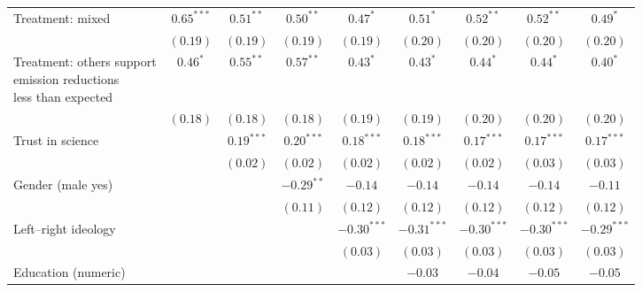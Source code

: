 \begin{table}[h]
\begin{center}
\begin{tabular}{l c c c c c c c c}
Treatment: mixed                                                                & $0.65^{***}$ & $0.51^{**}$   & $0.50^{**}$   & $0.47^{*}$    & $0.51^{*}$    & $0.52^{**}$   & $0.52^{**}$   & $0.49^{*}$    \\
                                                                                & $(0.19)$     & $(0.19)$      & $(0.19)$      & $(0.19)$      & $(0.20)$      & $(0.20)$      & $(0.20)$      & $(0.20)$      \\
\shortstack{Treatment: others support\\emission reductions\\less than expected} & $0.46^{*}$   & $0.55^{**}$   & $0.57^{**}$   & $0.43^{*}$    & $0.43^{*}$    & $0.44^{*}$    & $0.44^{*}$    & $0.40^{*}$    \\
                                                                                & $(0.18)$     & $(0.18)$      & $(0.18)$      & $(0.19)$      & $(0.19)$      & $(0.20)$      & $(0.20)$      & $(0.20)$      \\
Trust in science                                                                &              & $0.19^{***}$  & $0.20^{***}$  & $0.18^{***}$  & $0.18^{***}$  & $0.17^{***}$  & $0.17^{***}$  & $0.17^{***}$  \\
                                                                                &              & $(0.02)$      & $(0.02)$      & $(0.02)$      & $(0.02)$      & $(0.02)$      & $(0.03)$      & $(0.03)$      \\
Gender (male yes)                                                               &              &               & $-0.29^{**}$  & $-0.14$       & $-0.14$       & $-0.14$       & $-0.14$       & $-0.11$       \\
                                                                                &              &               & $(0.11)$      & $(0.12)$      & $(0.12)$      & $(0.12)$      & $(0.12)$      & $(0.12)$      \\
Left–right ideology                                                             &              &               &               & $-0.30^{***}$ & $-0.31^{***}$ & $-0.30^{***}$ & $-0.30^{***}$ & $-0.29^{***}$ \\
                                                                                &              &               &               & $(0.03)$      & $(0.03)$      & $(0.03)$      & $(0.03)$      & $(0.03)$      \\
Education (numeric)                                                             &              &               &               &               & $-0.03$       & $-0.04$       & $-0.05$       & $-0.05$       \\

\end{tabular}
\end{center}
\end{table}
